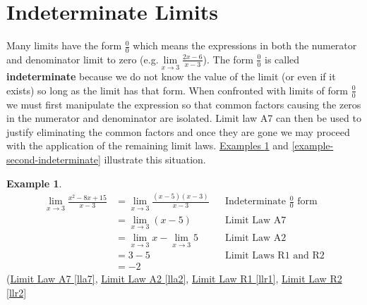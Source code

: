 \documentclass[12pt,]{book}
\newcommand{\terminology}[1]{\textbf{#1}}
\theoremstyle{plain}
\theoremstyle{definition}
\newtheorem{example}[theorem]{Example}
\numberwithin{equation}{section}
\begin{document}
\section[Indeterminate Limits]{Indeterminate Limits}\label{section-indeterminate-limits}
Many limits have the form \(\frac{0}{0}\) which means the expressions in both the numerator and denominator limit to zero (e.g.\@\(\lim\limits_{x\to3}\frac{2x-6}{x-3}\)). The form \(\frac{0}{0}\) is called \terminology{indeterminate} because we do not know the value of the limit (or even if it exists) so long as the limit has that form. When confronted with limits of form \(\frac{0}{0}\) we must first manipulate the expression so that common factors causing the zeros in the numerator and denominator are isolated. Limit law A7 can then be used to justify eliminating the common factors and once they are gone we may proceed with the application of the remaining limit laws. \hyperref[example-first-indeterminate]{Examples \ref{example-first-indeterminate}} and \hyperref[example-second-indeterminate]{\ref{example-second-indeterminate}} illustrate this situation.%
\begin{example}\label{example-first-indeterminate}
\begin{align*}
\lim_{x\to3}\frac{x^2-8x+15}{x-3}&=\lim_{x\to3}\frac{(x-5)(x-3)}{x-3}&&\text{Indeterminate $\frac{0}{0}$ form}\\
&=\lim_{x\to3}(x-5)&&\text{Limit Law A7}\\
&=\lim_{x\to3}x-\lim_{x\to3}5&&\text{Limit Law A2}\\
&=3-5&&\text{Limit Laws R1 and R2}\\
&=-2
\end{align*}(\hyperref[lla7]{Limit Law A7 \ref{lla7}}, \hyperref[lla2]{Limit Law A2 \ref{lla2}}, \hyperref[llr1]{Limit Law R1 \ref{llr1}}, \hyperref[llr2]{Limit Law R2 \ref{llr2}}%
\end{example}
\end{document}
